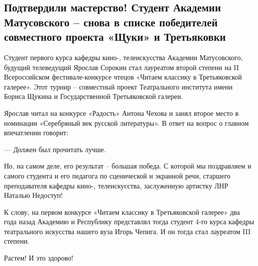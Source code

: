  
 
 
 
 
\subsection{Подтвердили мастерство! Студент Академии Матусовского – снова в списке победителей совместного проекта «Щуки» и Третьяковки}
\label{sec:24_11_2021.stz.edu.lnr.lgaki.1.konkurs_trevjakovka}


Студент первого курса кафедры кино-, телеискусства Академии Матусовского,
будущий телеведущий Ярослав Сорокин стал лауреатом второй степени на II
Всероссийском фестивале-конкурсе чтецов «Читаем классику в Третьяковской
галерее». Этот турнир – совместный проект Театрального института имени Бориса
Щукина и Государственной Третьяковской галереи.

Ярослав читал на конкурсе «Радость» Антона Чехова и занял второе место в
номинации «Серебряный век русской литературы». В ответ на вопрос о главном
впечатлении говорит:

— Должен был прочитать лучше.

Но, на самом деле, его результат – большая победа. С которой мы поздравляем и
самого студента и его педагога по сценической и экранной речи, старшего
преподавателя кафедры кино-, телеискусства, заслуженную артистку ЛНР Наталью
Недоступ!


К слову, на первом конкурсе «Читаем классику в Третьяковской галерее» два года
назад Академию и Республику представлял тогда студент 4-го курса кафедры
театрального искусства нашего вуза Игорь Чепига. И он тогда стал лауреатом III
степени.

Растем! И это здорово!


